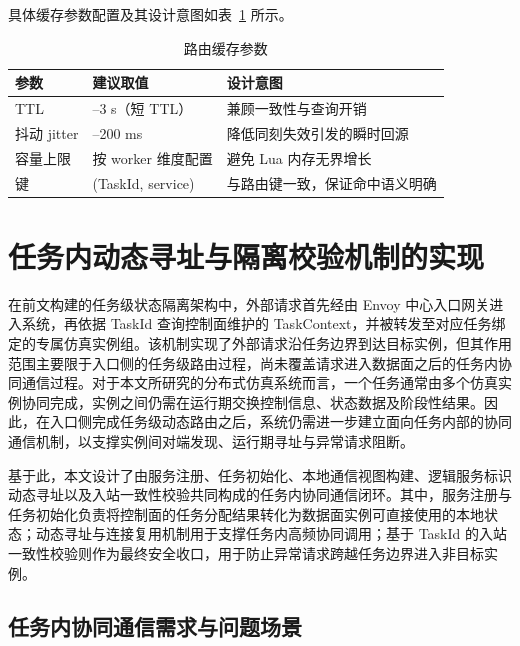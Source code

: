 \documentclass[lang=chs, degree=master, blindreview=true, winfonts=true, academic=false]{yanputhesis}
\begin{document}
具体缓存参数配置及其设计意图如表~\ref{tab:4_cache_config} 所示。
\begin{table}[!h]
    \centering
    \caption{路由缓存参数}
    \label{tab:4_cache_config}
    \begin{tabularx}{\textwidth}{>{\centering\arraybackslash}p{}
                                  >{\centering\arraybackslash}p{}
                                  >{\centering\arraybackslash}X}
        \toprule
        参数 & 建议取值 & 设计意图 \\ \midrule
        TTL & 1--3 s（短 TTL） & 兼顾一致性与查询开销 \\
        抖动 jitter & 0--200 ms & 降低同刻失效引发的瞬时回源 \\
        容量上限 & 按 worker 维度配置 & 避免 Lua 内存无界增长 \\
        键 & (TaskId, service) & 与路由键一致，保证命中语义明确 \\
        \bottomrule
    \end{tabularx}
\end{table}

\section{任务内动态寻址与隔离校验机制的实现}

在前文构建的任务级状态隔离架构中，外部请求首先经由 Envoy 中心入口网关进入系统，再依据 TaskId 查询控制面维护的 TaskContext，并被转发至对应任务绑定的专属仿真实例组。该机制实现了外部请求沿任务边界到达目标实例，但其作用范围主要限于入口侧的任务级路由过程，尚未覆盖请求进入数据面之后的任务内协同通信过程。对于本文所研究的分布式仿真系统而言，一个任务通常由多个仿真实例协同完成，实例之间仍需在运行期交换控制信息、状态数据及阶段性结果。因此，在入口侧完成任务级动态路由之后，系统仍需进一步建立面向任务内部的协同通信机制，以支撑实例间对端发现、运行期寻址与异常请求阻断。

基于此，本文设计了由服务注册、任务初始化、本地通信视图构建、逻辑服务标识动态寻址以及入站一致性校验共同构成的任务内协同通信闭环。其中，服务注册与任务初始化负责将控制面的任务分配结果转化为数据面实例可直接使用的本地状态；动态寻址与连接复用机制用于支撑任务内高频协同调用；基于 TaskId 的入站一致性校验则作为最终安全收口，用于防止异常请求跨越任务边界进入非目标实例。

\subsection{任务内协同通信需求与问题场景}
\end{document}
